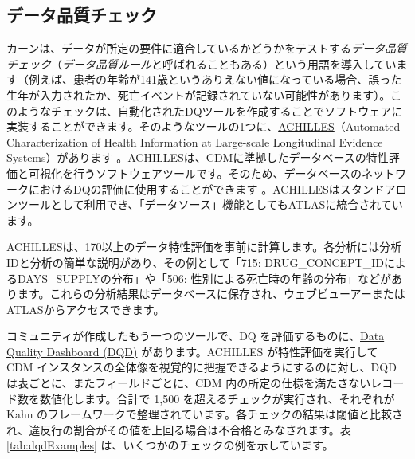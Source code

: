 \documentclass[
  11pt]{book}
\theoremstyle{definition}
\theoremstyle{definition}
\theoremstyle{definition}
\theoremstyle{definition}
\theoremstyle{remark}
\begin{document}
 

\subsection{データ品質チェック}\label{ux30c7ux30fcux30bfux54c1ux8ceaux30c1ux30a7ux30c3ux30af}

 

カーンは、データが所定の要件に適合しているかどうかをテストする\emph{データ品質チェック}（\emph{データ品質ルール}と呼ばれることもある）という用語を導入しています（例えば、患者の年齢が141歳というありえない値になっている場合、誤った生年が入力されたか、死亡イベントが記録されていない可能性があります）。このようなチェックは、自動化されたDQツールを作成することでソフトウェアに実装することができます。そのようなツールの1つに、\href{https://github.com/OHDSI/Achilles}{ACHILLES}（Automated Characterization of Health Information at Large-scale Longitudinal Evidence Systems）があります \citep{huser_methods_2018}。ACHILLESは、CDMに準拠したデータベースの特性評価と可視化を行うソフトウェアツールです。そのため、データベースのネットワークにおけるDQの評価に使用することができます \citep{huser_multisite_2016} 。ACHILLESはスタンドアロンツールとして利用でき、「データソース」機能としてもATLASに統合されています。

ACHILLESは、170以上のデータ特性評価を事前に計算します。各分析には分析IDと分析の簡単な説明があり、その例として「715: DRUG\_CONCEPT\_IDによるDAYS\_SUPPLYの分布」や「506: 性別による死亡時の年齢の分布」などがあります。これらの分析結果はデータベースに保存され、ウェブビューアーまたはATLASからアクセスできます。

コミュニティが作成したもう一つのツールで、DQ を評価するものに、\href{https://github.com/OHDSI/DataQualityDashboard}{Data Quality Dashboard (DQD)} があります。ACHILLES が特性評価を実行して CDM インスタンスの全体像を視覚的に把握できるようにするのに対し、DQD は表ごとに、またフィールドごとに、CDM 内の所定の仕様を満たさないレコード数を数値化します。合計で 1,500 を超えるチェックが実行され、それぞれが Kahn のフレームワークで整理されています。各チェックの結果は閾値と比較され、違反行の割合がその値を上回る場合は不合格とみなされます。表 \ref{tab:dqdExamples} は、いくつかのチェックの例を示しています。
\end{document}
